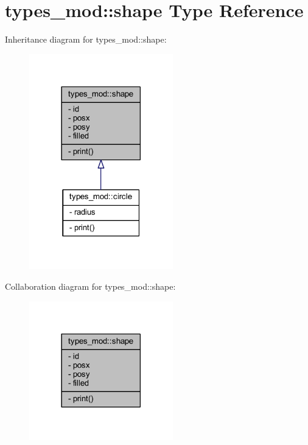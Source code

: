 \hypertarget{structtypes__mod_1_1shape}{}\section{types\+\_\+mod\+:\+:shape Type Reference}
\label{structtypes__mod_1_1shape}


Inheritance diagram for types\+\_\+mod\+:\+:shape\+:
\nopagebreak
\begin{figure}[H]
\begin{center}
\leavevmode
\includegraphics[width=177pt]{structtypes__mod_1_1shape__inherit__graph}
\end{center}
\end{figure}


Collaboration diagram for types\+\_\+mod\+:\+:shape\+:
\nopagebreak
\begin{figure}[H]
\begin{center}
\leavevmode
\includegraphics[width=177pt]{structtypes__mod_1_1shape__coll__graph}
\end{center}
\end{figure}
